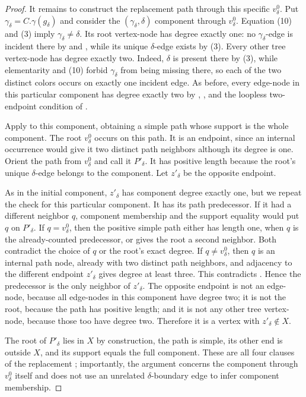 \begin{proof}
It remains to construct the replacement path through this specific
$v^0_\delta$.  Put $\gamma_\delta=C.\gamma(g_\delta)$ and consider the
$(\gamma_\delta,\delta)$ component through $v^0_\delta$.  Equation (10)
and (3) imply $\gamma_\delta\ne\delta$.  Its root vertex-node has degree
exactly one: no $\gamma_\delta$-edge is incident there by
 and , while its unique
$\delta$-edge exists by (3).  Every other tree vertex-node has degree
exactly two.  Indeed, $\delta$ is present there by (3), while elementarity
and (10) forbid $\gamma_\delta$ from being missing there, so each of the
two distinct colors occurs on exactly one incident edge.  As before, every
edge-node in this particular component has degree exactly two by
, , and the loopless
two-endpoint condition of .

Apply  to this component, obtaining
a simple path whose support is the whole component.  The root
$v^0_\delta$ occurs on this path.  It is an endpoint, since an internal
occurrence would give it two distinct path neighbors although its degree is
one.  Orient the path from $v^0_\delta$ and call it $P'_\delta$.  It has
positive length because the root's unique $\delta$-edge belongs to the
component.  Let $z'_\delta$ be the opposite endpoint.

As in the initial component, $z'_\delta$ has component degree exactly one,
but we repeat the check for this particular component.  It has its path
predecessor.  If it had a different neighbor $q$, component membership and
the support equality would put $q$ on $P'_\delta$.  If $q=v^0_\delta$,
then the positive simple path either has length one, when $q$ is the
already-counted predecessor, or gives the root a second neighbor.  Both
contradict the choice of $q$ or the root's exact degree.  If
$q\ne v^0_\delta$, then $q$ is an internal path node, already with two
distinct path neighbors, and adjacency to the different endpoint
$z'_\delta$ gives degree at least three.  This contradicts
.  Hence the predecessor is the
only neighbor of $z'_\delta$.  The opposite endpoint is not an edge-node,
because all edge-nodes in this component have degree two; it is not the
root, because the path has positive length; and it is not any other tree
vertex-node, because those too have degree two.  Therefore it is a vertex
with $z'_\delta\notin X$.

The root of $P'_\delta$ lies in $X$ by construction, the path is simple,
its other end is outside $X$, and its support equals the full component.
These are all four clauses of the replacement
; importantly, the argument concerns the
component through $v^0_\delta$ itself and does not use an unrelated
$\delta$-boundary edge to infer component membership.


\end{proof}
